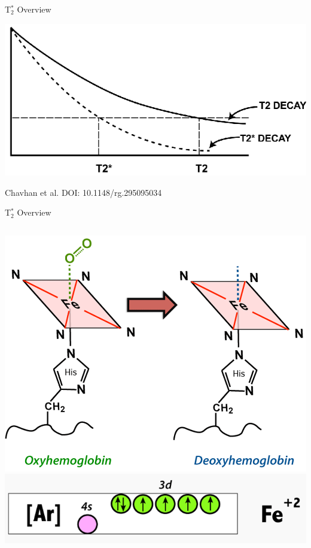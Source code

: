 \documentclass[aspectratio=169,xcolor=dvipsnames]{beamer}
\begin{document}

\begin{frame}{T$_{2}^{*}$ Overview}

\includegraphics[width=1\textwidth]{imgs/t2stardecay}

\tiny{Chavhan et al. DOI: 10.1148/rg.295095034}

\end{frame}


\begin{frame}{T$_{2}^{*}$ Overview}
\begin{columns}[c]
\includegraphics[width=1\textwidth]{imgs/deoxy}
\includegraphics[width=1\textwidth]{imgs/ferrous}
\end{columns}

\end{frame}
\end{document}
